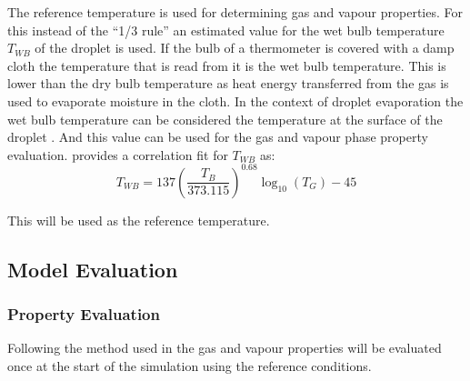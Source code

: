 \documentclass[../Interim_Report_Master]{subfiles}
\begin{document}
The reference temperature is used for determining gas and vapour properties. For this instead of the ``1/3 rule'' an estimated value for the wet bulb temperature $T_{WB}$ of the droplet is used. If the bulb of a thermometer is covered with a damp cloth the temperature that is read from it is the wet bulb temperature. This is lower than the dry bulb temperature as heat energy transferred from the gas is used to evaporate moisture in the cloth. In the context of droplet evaporation the wet bulb temperature can be considered the temperature at the surface of the droplet \cite{lukashov2003}. And this value can be used for the gas and vapour phase property evaluation. \cite{Miller1998} provides a correlation fit for $T_{WB}$ as:
\begin{equation}
T_{WB} = 137\left(\frac{T_B}{373.115}\right)^{0.68}\log_{10}(T_G) - 45
\end{equation}

This will be used as the reference temperature.

\subsection{Model Evaluation}
\subsubsection{Property Evaluation}
Following the method used in \cite{Miller1998} the gas and vapour properties will be evaluated once at the start of the simulation using the reference conditions.
\end{document}
